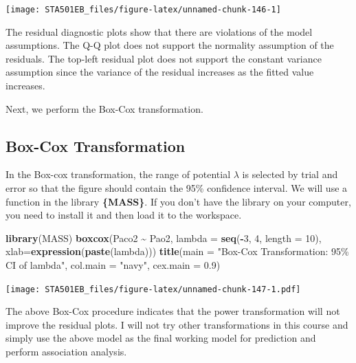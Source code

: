 \documentclass[
]{book}
\newenvironment{Shaded}{\begin{snugshade}}{\end{snugshade}}
\newcommand{\AttributeTok}[1]{\textcolor[rgb]{0.13,0.29,0.53}{#1}}
\newcommand{\DecValTok}[1]{\textcolor[rgb]{0.00,0.00,0.81}{#1}}
\newcommand{\FloatTok}[1]{\textcolor[rgb]{0.00,0.00,0.81}{#1}}
\newcommand{\FunctionTok}[1]{\textcolor[rgb]{0.13,0.29,0.53}{\textbf{#1}}}
\newcommand{\NormalTok}[1]{#1}
\newcommand{\SpecialCharTok}[1]{\textcolor[rgb]{0.81,0.36,0.00}{\textbf{#1}}}
\newcommand{\StringTok}[1]{\textcolor[rgb]{0.31,0.60,0.02}{#1}}
\begin{document}
\begin{center}\texttt{[image: STA501EB\_files/figure-latex/unnamed-chunk-146-1]} \end{center}

The residual diagnostic plots show that there are violations of the model assumptions. The Q-Q plot does not support the normality assumption of the residuals. The top-left residual plot does not support the constant variance assumption since the variance of the residual increases as the fitted value increases.

Next, we perform the Box-Cox transformation.

\hypertarget{box-cox-transformation}{%
\subsection{Box-Cox Transformation}\label{box-cox-transformation}}

In the Box-cox transformation, the range of potential \(\lambda\) is selected by trial and error so that the figure should contain the 95\% confidence interval. We will use a function in the library \textbf{\{MASS\}}. If you don't have the library on your computer, you need to install it and then load it to the workspace.

\begin{Shaded}
\begin{Highlighting}[]
\FunctionTok{library}\NormalTok{(MASS)}
\FunctionTok{boxcox}\NormalTok{(Paco2 }\SpecialCharTok{\textasciitilde{}}\NormalTok{ Pao2, }\AttributeTok{lambda =} \FunctionTok{seq}\NormalTok{(}\SpecialCharTok{{-}}\DecValTok{3}\NormalTok{, }\DecValTok{4}\NormalTok{, }\AttributeTok{length =} \DecValTok{10}\NormalTok{), }
       \AttributeTok{xlab=}\FunctionTok{expression}\NormalTok{(}\FunctionTok{paste}\NormalTok{(lambda)))}
\FunctionTok{title}\NormalTok{(}\AttributeTok{main =} \StringTok{"Box{-}Cox Transformation: 95\% CI of lambda"}\NormalTok{,}
      \AttributeTok{col.main =} \StringTok{"navy"}\NormalTok{, }\AttributeTok{cex.main =} \FloatTok{0.9}\NormalTok{)}
\end{Highlighting}
\end{Shaded}

\texttt{[image: STA501EB\_files/figure-latex/unnamed-chunk-147-1.pdf]}

The above Box-Cox procedure indicates that the power transformation will not improve the residual plots. I will not try other transformations in this course and simply use the above model as the final working model for prediction and perform association analysis.
\end{document}
